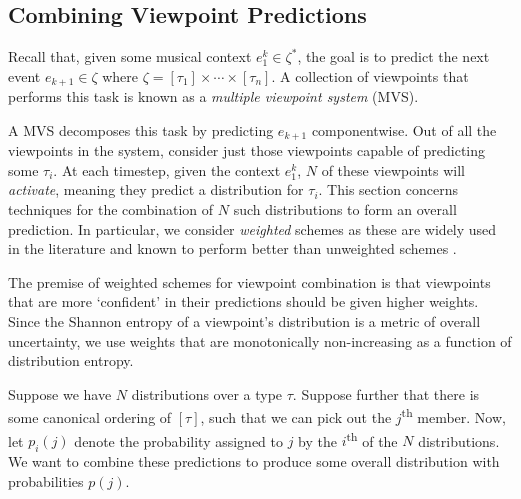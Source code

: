 \documentclass[12pt,a4paper,twoside,openright]{report}
\begin{document}
\subsection{Combining Viewpoint Predictions}\label{sec:vp-comb}

Recall that, given some musical context $e_1^k \in \zeta^*$, the goal is to
predict the next event $e_{k+1} \in \zeta$ where $\zeta = [\tau_1] \times \cdots
\times [\tau_n]$.  A collection of viewpoints that performs this task is known
as a \emph{multiple viewpoint system} (MVS). 

A MVS decomposes this task by predicting $e_{k+1}$ componentwise. Out of all the
viewpoints in the system, consider just those viewpoints capable of predicting
some $\tau_i$. At each timestep, given the context $e_1^k$, $N$ of these
viewpoints will \emph{activate}, meaning they predict a distribution for
$\tau_i$. This section concerns techniques for the combination of $N$ such
distributions to form an overall prediction. In particular, we consider
\emph{weighted} schemes as these are widely used in the literature and known to
perform better than unweighted schemes \cite{pearce2004combining}.

The premise of weighted schemes for viewpoint combination is that viewpoints
that are more `confident' in their predictions should be given higher weights.
Since the Shannon entropy of a viewpoint's distribution is a metric of overall
uncertainty, we use weights that are monotonically non-increasing as a function
of distribution entropy.

Suppose we have $N$ distributions over a type $\tau$. Suppose further that
there is some canonical ordering of $[\tau]$, such that we can pick out the
$j$\textsuperscript{th} member. Now, let $p_i(j)$ denote the probability
assigned to $j$ by the $i$\textsuperscript{th} of the $N$ distributions. We want
to combine these predictions to produce some overall distribution with
probabilities $p(j)$.
\end{document}

